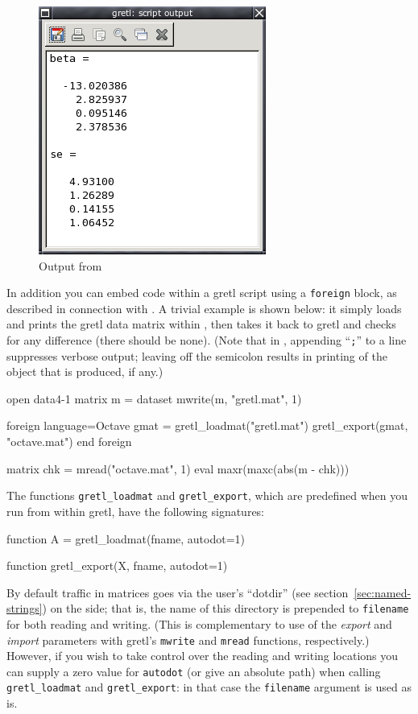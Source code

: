 \begin{figure}[htbp]
  \centering
  \includegraphics[scale=0.7]{figures/Octout}
  \caption{Output from }
  \label{fig:Octout}
\end{figure}

In addition you can embed  code within a gretl script
using a \texttt{foreign} block, as described in connection with
.  A trivial example is shown below: it simply loads and prints
the gretl data matrix within , then takes it back to gretl
and checks for any difference (there should be none). (Note that in
, appending ``\texttt{;}'' to a line suppresses verbose
output; leaving off the semicolon results in printing of the object
that is produced, if any.)
%
\begin{code}
open data4-1
matrix m = { dataset }
mwrite(m, "gretl.mat", 1)

foreign language=Octave
   gmat = gretl_loadmat("gretl.mat")
   gretl_export(gmat, "octave.mat")
end foreign

matrix chk = mread("octave.mat", 1)
eval maxr(maxc(abs(m - chk)))
\end{code}

The functions \texttt{gretl\_loadmat} and \texttt{gretl\_export},
which are predefined when you run  from within gretl, have
the following signatures:
\begin{code}
function A = gretl_loadmat(fname, autodot=1)

function gretl_export(X, fname, autodot=1)
\end{code}

By default traffic in matrices goes via the user's ``dotdir'' (see
section~\ref{sec:named-strings}) on the  side; that is,
the name of this directory is prepended to \texttt{filename} for both
reading and writing. (This is complementary to use of the
\textsl{export} and \textsl{import} parameters with gretl's
\texttt{mwrite} and \texttt{mread} functions, respectively.)  However,
if you wish to take control over the reading and writing locations you
can supply a zero value for \texttt{autodot} (or give an absolute
path) when calling \verb|gretl_loadmat| and \verb|gretl_export|: in
that case the \texttt{filename} argument is used as is.

